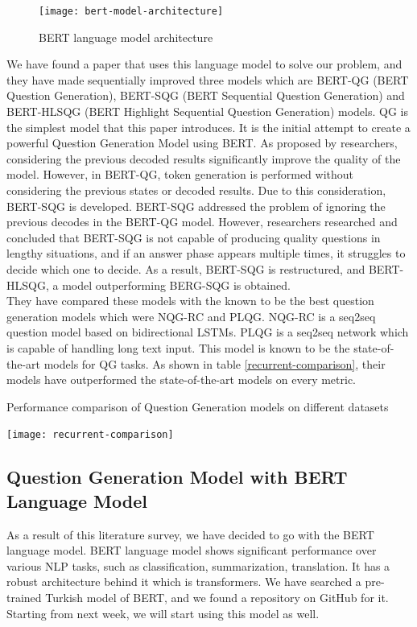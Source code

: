 \documentclass{mefsdp}
\begin{document}
	\begin{figure}[ht!]
		\centering
		\texttt{[image: bert-model-architecture]}
		\caption{BERT language model architecture\label{bert-architecture}}
	\end{figure}
	We have found a paper that uses this language model to solve our problem, and they have made sequentially improved three models which are BERT-QG (BERT Question Generation), BERT-SQG (BERT Sequential Question Generation) and BERT-HLSQG (BERT Highlight Sequential Question Generation) models. QG is the simplest model that this paper introduces. It is the initial attempt to create a powerful Question Generation Model using BERT. As proposed by researchers, considering the previous decoded results significantly improve the quality of the model. However, in BERT-QG, token generation is performed without considering the previous states or decoded results. Due to this consideration, BERT-SQG is developed. BERT-SQG addressed the problem of ignoring the previous decodes in the BERT-QG model. However, researchers researched and concluded that BERT-SQG is not capable of producing quality questions in lengthy situations, and if an answer phase appears multiple times, it struggles to decide which one to decide. As a result, BERT-SQG is restructured, and BERT-HLSQG, a model outperforming BERG-SQG is obtained.\\
	
	They have compared these models with the known to be the best question generation models which were NQG-RC and PLQG. NQG-RC is a seq2seq question model based on bidirectional LSTMs. PLQG is a seq2seq network which is capable of handling long text input. This model is known to be the state-of-the-art models for QG tasks. As shown in table \ref{recurrent-comparison}, their models have outperformed the state-of-the-art models on every metric.\\
	\begin{table}[ht!]
		\caption{Performance comparison of Question Generation models on different datasets\label{recurrent-comparison}}
		\centering
		\texttt{[image: recurrent-comparison]}
	\end{table}
	
	\subsection{Question Generation Model with BERT Language Model}
	As a result of this literature survey, we have decided to go with the BERT language model. BERT language model shows significant performance over various NLP tasks, such as classification, summarization, translation. It has a robust architecture behind it which is transformers. We have searched a pre-trained Turkish model of BERT, and we found a repository on GitHub for it. Starting from next week, we will start using this model as well.\\
	
\end{document}
